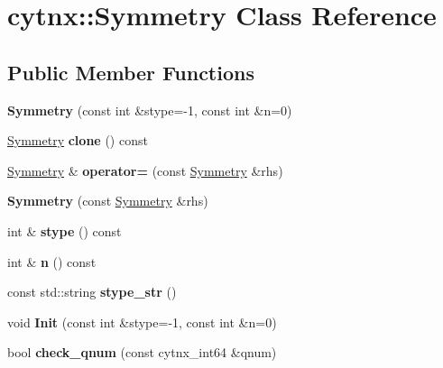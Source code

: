 \hypertarget{classcytnx_1_1Symmetry}{}\section{cytnx\+:\+:Symmetry Class Reference}
\label{classcytnx_1_1Symmetry}
\subsection*{Public Member Functions}
\begin{DoxyCompactItemize}
\item 
\mbox{\label{classcytnx_1_1Symmetry_a6f867aa12315130eee0cde8d78ad1932}} 
{\bfseries Symmetry} (const int \&stype=-\/1, const int \&n=0)
\item 
\mbox{\label{classcytnx_1_1Symmetry_a2b407bcad5cdad20edddffeeda6befe7}} 
\hyperlink{classcytnx_1_1Symmetry}{Symmetry} {\bfseries clone} () const
\item 
\mbox{\label{classcytnx_1_1Symmetry_a56e1acd0f2819a76dc1ecebd5fc5f68b}} 
\hyperlink{classcytnx_1_1Symmetry}{Symmetry} \& {\bfseries operator=} (const \hyperlink{classcytnx_1_1Symmetry}{Symmetry} \&rhs)
\item 
\mbox{\label{classcytnx_1_1Symmetry_ade26a3064b4b1db5b9d7e5ad367b9150}} 
{\bfseries Symmetry} (const \hyperlink{classcytnx_1_1Symmetry}{Symmetry} \&rhs)
\item 
\mbox{\label{classcytnx_1_1Symmetry_ae1f07ee701371e161a6873230fe2f331}} 
int \& {\bfseries stype} () const
\item 
\mbox{\label{classcytnx_1_1Symmetry_a7da9fe0ac39f231e35fa087ac186219a}} 
int \& {\bfseries n} () const
\item 
\mbox{\label{classcytnx_1_1Symmetry_a42f9e6b967e1b02a394cb731d014eb7e}} 
const std\+::string {\bfseries stype\+\_\+str} ()
\item 
\mbox{\label{classcytnx_1_1Symmetry_a173cf2290a246fd6474532ede50e1c89}} 
void {\bfseries Init} (const int \&stype=-\/1, const int \&n=0)
\item 
\mbox{\label{classcytnx_1_1Symmetry_a066741cabfe04df9e9e2782f047188b0}} 
bool {\bfseries check\+\_\+qnum} (const cytnx\+\_\+int64 \&qnum)
\end{DoxyCompactItemize}
